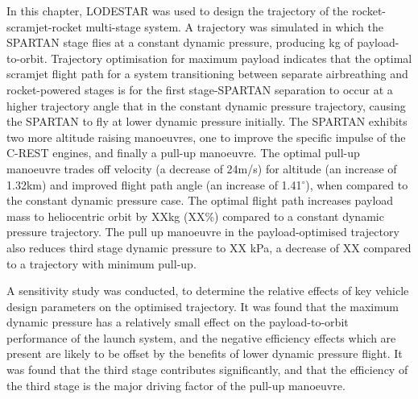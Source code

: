 In this chapter, LODESTAR was used to design the trajectory of the rocket-scramjet-rocket multi-stage system. 
A trajectory was simulated in which the SPARTAN stage flies at a constant dynamic pressure, producing \PayloadToOrbitConstq kg of payload-to-orbit. Trajectory optimisation for maximum payload indicates that the optimal scramjet flight path for a system transitioning between separate airbreathing and rocket-powered stages is for the first stage-SPARTAN separation to occur at a higher trajectory angle that in the constant dynamic pressure trajectory, causing the SPARTAN to fly at lower dynamic pressure initially. The SPARTAN exhibits two more altitude raising manoeuvres, one to improve the specific impulse of the C-REST engines, and finally a pull-up manoeuvre. The optimal pull-up manoeuvre trades off velocity (a decrease of 24m/s) for altitude (an increase of 1.32km) and improved flight path angle (an increase of 1.41$^\circ$), when compared to the constant dynamic pressure case. The optimal flight path increases payload mass to heliocentric orbit by XXkg (XX\%) compared to a constant dynamic pressure trajectory. The pull up manoeuvre in the payload-optimised trajectory also reduces third stage dynamic pressure to XX kPa, a decrease of XX compared to a trajectory with minimum pull-up. 

A sensitivity study was conducted, to determine the relative effects of key vehicle design parameters on the optimised trajectory. It was found that the maximum dynamic pressure has a relatively small effect on the payload-to-orbit performance of the launch system, and the negative efficiency effects which are present are likely to be offset by the benefits of lower dynamic pressure flight. 
It was found that the third stage contributes significantly, and that the efficiency of the third stage is the major driving factor of the pull-up manoeuvre. 
